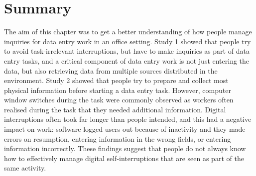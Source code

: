 \section{Summary}
The aim of this chapter was to get a better understanding of how people manage inquiries for data entry work in an office setting. Study 1 showed that people try to avoid task-irrelevant interruptions, but have to make inquiries as part of data entry tasks, and a critical component of data entry work is not just entering the data, but also retrieving data from multiple sources distributed in the environment. Study 2 showed that people try to prepare and collect most physical information before starting a data entry task. However, computer window switches during the task were commonly observed as workers often realised during the task that they needed additional information. Digital interruptions often took far longer than people intended, and this had a negative impact on work: software logged users out because of inactivity and they made errors on resumption, entering information in the wrong fields, or entering information incorrectly. These findings suggest that people do not always know how to effectively manage digital self-interruptions that are seen as part of the same activity. 


